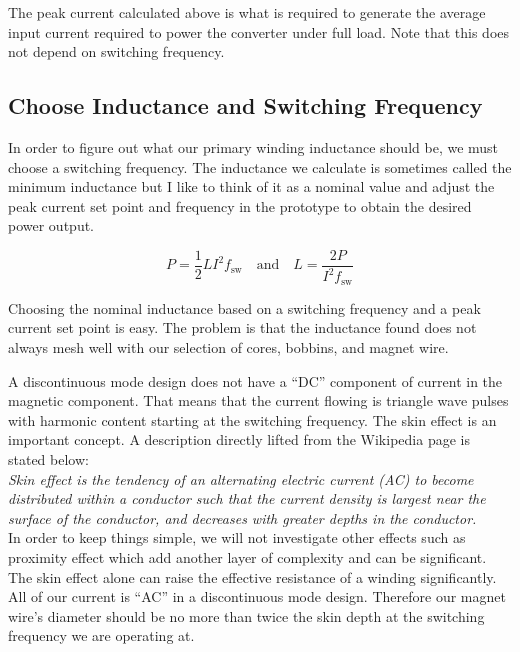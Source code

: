 \documentclass{article}
\begin{document}
The peak current calculated above is what is required to generate
the average input current required to power the converter under full load.
Note that this does not depend on switching frequency.

\subsection{Choose Inductance and Switching Frequency}

In order to figure out what our primary winding inductance should be, we 
must choose a switching frequency.  The inductance we calculate is sometimes
called the minimum inductance but I like to think of it as a nominal value
and adjust the peak current set point and frequency in the prototype to
obtain the desired power output.

\begin{equation}
    P = \frac{1}{2} LI^2 f_{\text{sw}} \quad \text{and} \quad L = \frac{2P}{I^2 f_{\text{sw}}}
    \label{eq:inductance4}
\end{equation}

Choosing the nominal inductance based
on a switching frequency and a peak current set point is easy.  The problem is
that the inductance found does not always mesh well with our selection of cores,
bobbins, and magnet wire.

A discontinuous mode design does not have a “DC” component of current in the magnetic
component.  That means that the current flowing is triangle wave pulses with harmonic
content starting at the switching frequency.  The skin effect is an important concept.
A description directly lifted from the Wikipedia page is stated below: \\

\emph{Skin effect is the tendency of an alternating electric current (AC) to become
distributed within a conductor such that the current density is largest near the
surface of the conductor, and decreases with greater depths in the conductor.} \\

In order to keep things simple, we will not investigate other effects such as proximity
effect which add another layer of complexity and can be significant.  The skin effect
alone can raise the effective resistance of a winding significantly.  All of our
current is “AC” in a discontinuous mode design.  Therefore our magnet wire’s diameter
should be no more than twice the skin depth at the switching frequency we are operating
at.
\end{document}
